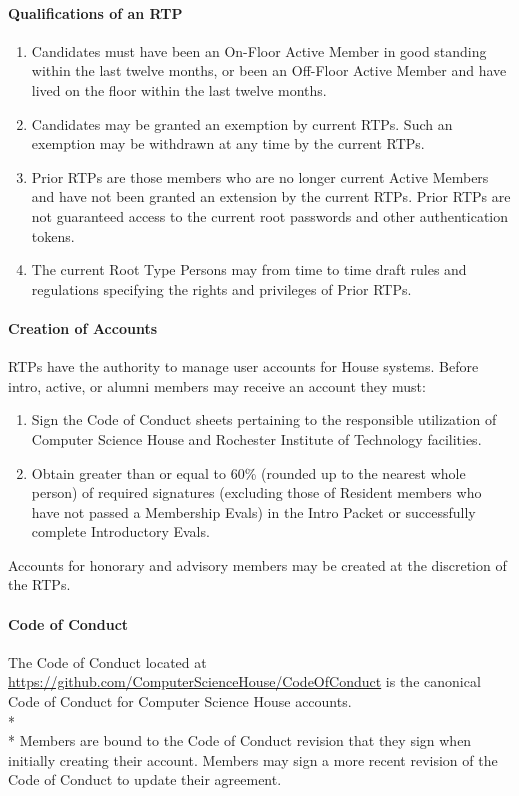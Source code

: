 \documentclass{article}
\newcommand{\asubsubsection}[1]{\paragraph{#1} \label{#1}}
\begin{document}
\asubsubsection{Qualifications of an RTP}
\renewcommand{\theenumi}{\alph{enumi}} %
\begin{enumerate}
	\item Candidates must have been an On-Floor Active Member in good standing within the last twelve months, or been an Off-Floor Active Member and have lived on the floor within the last twelve months.
	\item Candidates may be granted an exemption by current RTPs.
		Such an exemption may be withdrawn at any time by the current RTPs.
	\item Prior RTPs are those members who are no longer current Active Members and have not been granted an extension by the current RTPs.
		Prior RTPs are not guaranteed access to the current root passwords and other authentication tokens.
	\item The current Root Type Persons may from time to time draft rules and regulations specifying the rights and privileges of Prior RTPs.
\end{enumerate}

\asubsubsection{Creation of Accounts}
RTPs have the authority to manage user accounts for House systems.
Before intro, active, or alumni members may receive an account they must:
\renewcommand{\theenumi}{\alph{enumi}} %
\begin{enumerate}
	\item Sign the Code of Conduct sheets pertaining to the responsible utilization of Computer Science House and Rochester Institute of Technology facilities.
	\item Obtain greater than or equal to 60\% (rounded up to the nearest whole person) of required signatures (excluding those of Resident members who have not passed a Membership Evals) in the Intro Packet or successfully complete Introductory Evals.
\end{enumerate}
Accounts for honorary and advisory members may be created at the discretion of the RTPs.

\asubsubsection{Code of Conduct}
The Code of Conduct located at \url{https://github.com/ComputerScienceHouse/CodeOfConduct} is the canonical Code of Conduct for Computer Science House accounts.
\\* \\*
Members are bound to the Code of Conduct revision that they sign when initially creating their account.
Members may sign a more recent revision of the Code of Conduct to update their agreement.
\end{document}
